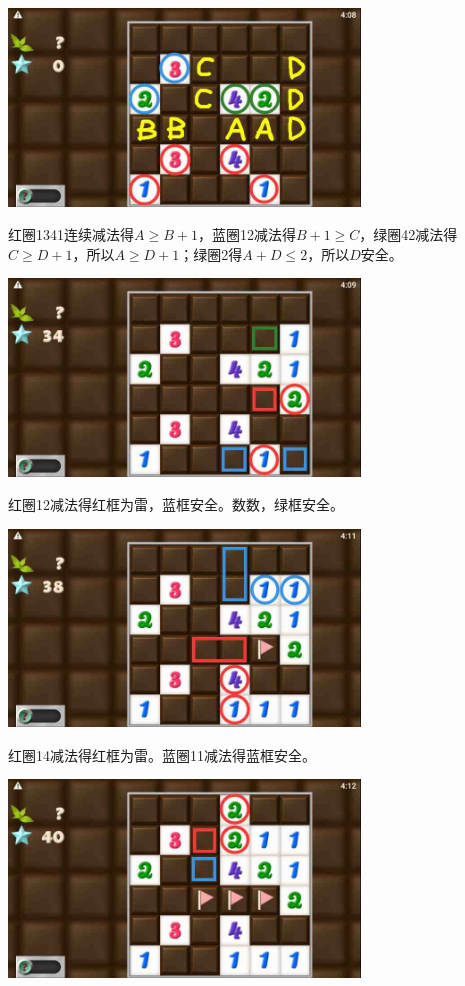 \subsection{} %
\begin{center}
    \includegraphics[width=0.7\textwidth]{puzzlelow/245-1.jpg}
\end{center}
红圈1341连续减法得$A\ge B+1$，蓝圈12减法得$B+1\ge C$，绿圈42减法得$C\ge D+1$，所以$A\ge D+1$；绿圈2得$A+D\le 2$，所以$D$安全。
\begin{center}
    \includegraphics[width=0.7\textwidth]{puzzlelow/245-2.jpg}
\end{center}
红圈12减法得红框为雷，蓝框安全。数数，绿框安全。
\begin{center}
    \includegraphics[width=0.7\textwidth]{puzzlelow/245-3.jpg}
\end{center}
红圈14减法得红框为雷。蓝圈11减法得蓝框安全。
\begin{center}
    \includegraphics[width=0.7\textwidth]{puzzlelow/245-4.jpg}
\end{center}

